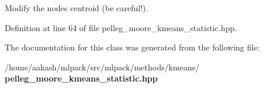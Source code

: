 Modify the node\textquotesingle{}s centroid (be careful!). 



Definition at line 64 of file pelleg\+\_\+moore\+\_\+kmeans\+\_\+statistic.\+hpp.



The documentation for this class was generated from the following file\+:\begin{DoxyCompactItemize}
\item 
/home/aakash/mlpack/src/mlpack/methods/kmeans/\textbf{ pelleg\+\_\+moore\+\_\+kmeans\+\_\+statistic.\+hpp}\end{DoxyCompactItemize}
